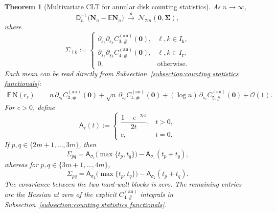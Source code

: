 \documentclass[a4paper]{article}
\newtheorem{theorem}{Theorem}[section]
\numberwithin{equation}{section}
\begin{document}
\begin{theorem}[Multivariate CLT for annular disk counting statistics]
\label{theorem:annular-multivariate-clt}
As $n\to\infty$,
\begin{equation}
\mathsf D_n^{-1}
\bigl(\boldsymbol N_n-\mathbb E\boldsymbol N_n\bigr)
\ \xrightarrow{\ d\ }\
\mathcal N_{7m}(\boldsymbol0,\boldsymbol\Sigma),
\label{eq:annular-multivariate-clt}
\end{equation}
where
\begin{equation}
\Sigma_{\ell k}
:=\begin{cases}
\partial_{s_\ell}\partial_{s_k}
C_{3,\#}^{(\mathrm{an})}(\boldsymbol0),
&\ell,k\in I_{\mathrm h},\\[2pt]
\partial_{s_\ell}\partial_{s_k}
C_{4,\#}^{(\mathrm{an})}(\boldsymbol0),
&\ell,k\in I_{\mathrm r},\\[2pt]
0,&\text{otherwise}.
\end{cases}
\label{def:annular-counting-limit-covariance}
\end{equation}
Each mean can be read directly from Subsection~\ref{subsection:counting statistics functionals}:
\begin{align}
\mathbb E\,\mathrm N(r_\ell)
&=n\,\partial_{s_\ell}C_{3,\#}^{(\mathrm{an})}(\boldsymbol0)
+\sqrt n\,\partial_{s_\ell}C_{4,\#}^{(\mathrm{an})}(\boldsymbol0)
+(\log n)\,\partial_{s_\ell}C_{5,\#}^{(\mathrm{an})}(\boldsymbol0)
+\mathcal O(1).
\label{eq:annular-counting-means}
\end{align}
For $c>0$, define
\begin{equation}
\mathsf A_c(t):=
\begin{cases}
\dfrac{1-e^{-2ct}}{2t},&t>0,\\[5pt]
c,&t=0.
\end{cases}
\label{def:hard-edge-covariance-function}
\end{equation}
If $p,q\in\{2m+1,\ldots,3m\}$, then
\begin{equation}
\Sigma_{pq}
=\mathsf A_{\sigma_1}\!\bigl(\max\{t_p,t_q\}\bigr)
-\mathsf A_{\sigma_1}(t_p+t_q),
\label{eq:inner-hard-edge-covariance}
\end{equation}
whereas for $p,q\in\{3m+1,\ldots,4m\}$,
\begin{equation}
\Sigma_{pq}
=\mathsf A_{\sigma_2}\!\bigl(\max\{t_p,t_q\}\bigr)
-\mathsf A_{\sigma_2}(t_p+t_q).
\label{eq:outer-hard-edge-covariance}
\end{equation}
The covariance between the two hard-wall blocks is zero.  The remaining
entries are the Hessian at zero of the explicit $C_{4,\#}^{(\mathrm{an})}$ integrals in Subsection~\ref{subsection:counting statistics functionals}.
\end{theorem}
\end{document}
